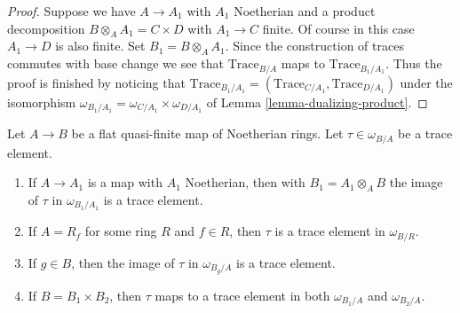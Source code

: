 \begin{proof}
Suppose we have $A \to A_1$ with $A_1$ Noetherian and
a product decomposition $B \otimes_A A_1 = C \times D$ with $A_1 \to C$
finite. Of course in this case $A_1 \to D$ is also finite.
Set $B_1 = B \otimes_A A_1$.
Since the construction of traces commutes with base change
we see that $\text{Trace}_{B/A}$ maps to $\text{Trace}_{B_1/A_1}$.
Thus the proof is finished by noticing that
$\text{Trace}_{B_1/A_1} = (\text{Trace}_{C/A_1}, \text{Trace}_{D/A_1})$
under the isomorphism
$\omega_{B_1/A_1} = \omega_{C/A_1} \times \omega_{D/A_1}$
of Lemma \ref{lemma-dualizing-product}.
\end{proof}

\begin{lemma}
\label{lemma-trace-base-change}
Let $A \to B$ be a flat quasi-finite map of Noetherian rings.
Let $\tau \in \omega_{B/A}$ be a trace element.
\begin{enumerate}
\item If $A \to A_1$ is a map with $A_1$ Noetherian, then with
$B_1 = A_1 \otimes_A B$ the image of $\tau$ in $\omega_{B_1/A_1}$ is a
trace element.
\item If $A = R_f$ for some ring $R$ and $f \in R$, then
$\tau$ is a trace element in $\omega_{B/R}$.
\item If $g \in B$, then the image of $\tau$ in $\omega_{B_g/A}$
is a trace element.
\item If $B = B_1 \times B_2$, then $\tau$ maps to a trace element
in both $\omega_{B_1/A}$ and $\omega_{B_2/A}$.
\end{enumerate}
\end{lemma}

